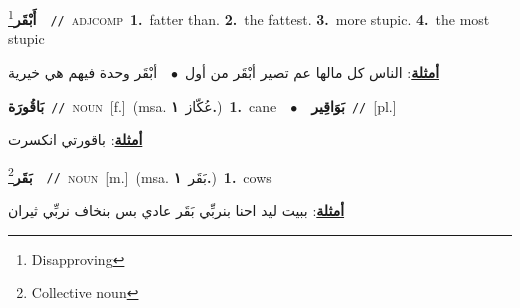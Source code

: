 \documentclass[10pt,a4paper,twoside]{article} %
\begin{document}
\begin{multicols}{2}
{\setlength\topsep{0pt}\textbf{\foreignlanguage{arabic}{أَبْقَر}}\footnote{Disapproving}\ \ {\color{gray}\texttt{//}\color{black}}\ \textsc{adj\textunderscore comp}\ \textbf{1.}~fatter than.  \textbf{2.}~the fattest.  \textbf{3.}~more stupic.  \textbf{4.}~the most stupic\  \begin{flushright}\color{gray}\foreignlanguage{arabic}{\textbf{\underline{\foreignlanguage{arabic}{أمثلة}}}: الناس كل مالها عم تصير أبْقَر من أول\ $\bullet$\ \  أبْقَر وحدة فيهم هي خيرية}\end{flushright}\color{black}} \vspace{2mm}

{\setlength\topsep{0pt}\textbf{\foreignlanguage{arabic}{بَاقُورَة}}\ {\color{gray}\texttt{//}\color{black}}\ \textsc{noun}\ [f.]\ \color{gray}(msa. \foreignlanguage{arabic}{عُكّاز}~\foreignlanguage{arabic}{\textbf{١.}})\color{black}\ \textbf{1.}~cane\ \ $\bullet$\ \ \setlength\topsep{0pt}\textbf{\foreignlanguage{arabic}{بَوَاقِير}}\ {\color{gray}\texttt{//}\color{black}}\ [pl.]\  \begin{flushright}\color{gray}\foreignlanguage{arabic}{\textbf{\underline{\foreignlanguage{arabic}{أمثلة}}}: باقورتي انكسرت}\end{flushright}\color{black}} \vspace{2mm}

{\setlength\topsep{0pt}\textbf{\foreignlanguage{arabic}{بَقَر}}\footnote{Collective noun}\ \ {\color{gray}\texttt{//}\color{black}}\ \textsc{noun}\ [m.]\ \color{gray}(msa. \foreignlanguage{arabic}{بَقَر}~\foreignlanguage{arabic}{\textbf{١.}})\color{black}\ \textbf{1.}~cows\  \begin{flushright}\color{gray}\foreignlanguage{arabic}{\textbf{\underline{\foreignlanguage{arabic}{أمثلة}}}: ببيت ليد احنا بنربِّي بَقَر عادي بس بنخاف نربِّي ثيران}\end{flushright}\color{black}} \vspace{2mm}


\end{multicols}
\end{document}
